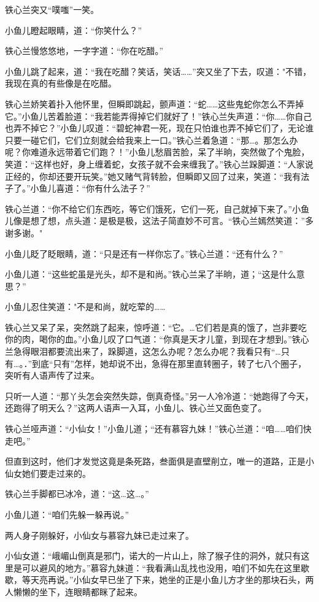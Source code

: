\documentclass[12pt,oneside]{book}
\begin{document}
铁心兰突又``噗嗤''一笑。

小鱼儿瞪起眼睛，道：``你笑什么？''

铁心兰慢悠悠地，一字字道：``你在吃醋。''

小鱼儿跳了起来，道：``我在吃醋？笑话，笑话\ldots\ldots{}''突又坐了下去，叹道："不错，我现在真的有些像是在吃醋。

铁心兰娇笑着扑入他怀里，但瞬即跳起，颤声道：``蛇\ldots\ldots 这些鬼蛇你怎么不弄掉它。''小鱼儿苦着脸道：``我若能弄得掉它们就好了！''铁心兰失声道：``你\ldots\ldots 你自己也弄不掉它？''小鱼儿叹道：``碧蛇神君一死，现在只怕谁也弄不掉它们了，无论谁只要一碰它们，它们立刻就会给我来上一口。''铁心兰着急道：``那\ldots。那怎么办呢？你难道永远带着它们跑？！''小鱼儿愁眉苦脸，呆了半晌，突然做了个鬼脸，笑道：``这样也好，身上缠着蛇，女孩子就不会来缠我了。''铁心兰跺脚道：``人家说正经的，你却还要开玩笑。''她又赌气背转脸，但瞬即又回了过来，笑道：``我有法子了。''小鱼儿喜道：``你有什么法子？''

铁心兰道：``你不给它们东西吃，等它们饿死，它们一死，自己就掉下来了。''小鱼儿像是想了想，点头道：是极是极，这法子简直妙不可言。``铁心兰嫣然笑道：''多谢多谢。"

小鱼儿眨了眨眼睛，道：``只是还有一样你忘了。''铁心兰道：``还有什么？''

小鱼儿道：``这些蛇虽是光头，却不是和尚。''铁心兰呆了半晌，道；``这是什么意思？''

小鱼儿忍住笑道："不是和尚，就吃荤的\ldots\ldots{}

铁心兰又呆了呆，突然跳了起来，惊呼道：``它。\ldots 它们若是真的饿了，岂非要吃你的肉，喝你的血。''小鱼儿叹了口气道：``你真是天才儿童，到现在才想到。''铁心兰急得眼泪都要流出来了，跺脚道，这怎么办呢？怎么办呢？我看只有``\ldots 只有\ldots。．''到底``只有''怎样，她却说不出，急得在那里直转圈子，转了七八个圈子，突听有人语声传了过来。

只听一人道：``那丫头怎会突然失踪，倒真奇怪。''另一人冷冷道：``她跑得了今天，还跑得了明天么？''这两人语声一入耳，小鱼儿、铁心兰又面色变了。

铁心兰哑声道：``小仙女！''小鱼儿道；``还有慕容九妹！''铁心兰道：``咱\ldots\ldots 咱们快走吧。''

但直到这时，他们才发觉这竟是条死路，叁面俱是直壁削立，唯一的道路，正是小仙女她们要走过来的。

铁心兰手脚都已冰冷，道：``这\ldots 这\ldots。''

小鱼儿道：``咱们先躲一躲再说。''

两人身子刚躲好，小仙女与慕容九妹已走过来了。

小仙女道：``峨嵋山倒真是邪门，诺大的一片山上，除了猴子住的洞外，就只有这里是可以避风的地方。''慕容九妹道：``我看满山乱找也没用，咱们不如先在这里歇歇，等天亮再说。''小仙女早已坐了下来，她坐的正是小鱼儿方才坐的那块石头，两人懒懒的坐下，连眼睛都眯了起来。
\end{document}
